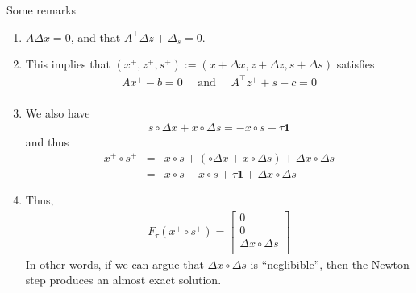 	Some remarks
	\begin{enumerate}
	\item $A \Delta x= 0$, and that $A^{\top} \Delta z + \Delta_s = 0$.
	\item This implies that $(x^+,z^+,s^+) := (x  + \Delta x, z+ \Delta z, s + \Delta s)$ satisfies
	\begin{eqnarray}
	Ax^+ - b = 0\quad  \text{ and } \quad A^{\top} z^+ + s - c = 0\\
	\end{eqnarray}
	\item We also have
	\begin{eqnarray}
	s \circ \Delta x + x \circ \Delta s = - x \circ s + \tau \mathbf{1}
	\end{eqnarray}
	and thus
	\begin{eqnarray}
	x^+ \circ s^+ &=& x\circ s + \left( \circ \Delta x + x \circ \Delta s\right) + \Delta x \circ \Delta s\\
	 &=&  x \circ s - x \circ s + \tau \mathbf{1} + \Delta  x \circ \Delta s
	\end{eqnarray}
	\item Thus, 
	\begin{eqnarray}
	F_{\tau}(x^+\circ s^+) = \begin{bmatrix} 0 \\
	0 \\
	\Delta  x \circ \Delta s \\
	\end{bmatrix}
	\end{eqnarray}
	In other words, if we can argue that $\Delta x \circ \Delta s$ is ``neglibible'', then the Newton step produces an almost exact solution. 
	\end{enumerate}

